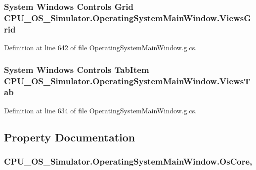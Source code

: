 \subsubsection[{Views\+Grid}]{\setlength{\rightskip}{0pt plus 5cm}System Windows Controls Grid C\+P\+U\+\_\+\+O\+S\+\_\+\+Simulator.\+Operating\+System\+Main\+Window.\+Views\+Grid\hspace{0.3cm}{\ttfamily [package]}}\label{class_c_p_u___o_s___simulator_1_1_operating_system_main_window_a956a6d8e53d4f47e27b3ba0b237292c7}


Definition at line 642 of file Operating\+System\+Main\+Window.\+g.\+cs.

\hypertarget{class_c_p_u___o_s___simulator_1_1_operating_system_main_window_a212223330899dc87b6dd0b1dd9fbbfd0}{}
\subsubsection[{Views\+Tab}]{\setlength{\rightskip}{0pt plus 5cm}System Windows Controls Tab\+Item C\+P\+U\+\_\+\+O\+S\+\_\+\+Simulator.\+Operating\+System\+Main\+Window.\+Views\+Tab\hspace{0.3cm}{\ttfamily [package]}}\label{class_c_p_u___o_s___simulator_1_1_operating_system_main_window_a212223330899dc87b6dd0b1dd9fbbfd0}


Definition at line 634 of file Operating\+System\+Main\+Window.\+g.\+cs.



\subsection{Property Documentation}
\hypertarget{class_c_p_u___o_s___simulator_1_1_operating_system_main_window_ad714e0ed6e880516f8afc3f1531a2d14}{}
\subsubsection[{Os\+Core}]{ C\+P\+U\+\_\+\+O\+S\+\_\+\+Simulator.\+Operating\+System\+Main\+Window.\+Os\+Core\hspace{0.3cm}{\ttfamily [get]}, {\ttfamily [set]}}\label{class_c_p_u___o_s___simulator_1_1_operating_system_main_window_ad714e0ed6e880516f8afc3f1531a2d14}


